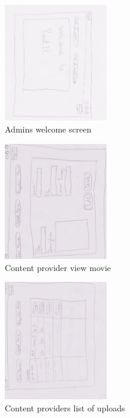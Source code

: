 \begin{figure}[!ht]
  \centering
    \includegraphics[angle=90, width=0.4\textwidth]{Parts/Appendix/Images/PaperMockup/AdminWelcome}
  \caption{Admins welcome screen}
  \label{fig:Appendix_GUI_sketches_AdminWelcome}
\end{figure}
\begin{figure}[!ht]
  \centering
    \includegraphics[angle=90, width=0.4\textwidth]{Parts/Appendix/Images/PaperMockup/CPEditmovie}
  \caption{Content provider view movie}
  \label{fig:Appendix_GUI_sketches_ViewMovie}
\end{figure}
\begin{figure}[!ht]
  \centering
    \includegraphics[angle=90, width=0.4\textwidth]{Parts/Appendix/Images/PaperMockup/CPMovieList}
  \caption{Content providers list of uploads}
  \label{fig:Appendix_GUI_sketches_ListofUploads}
\end{figure}
